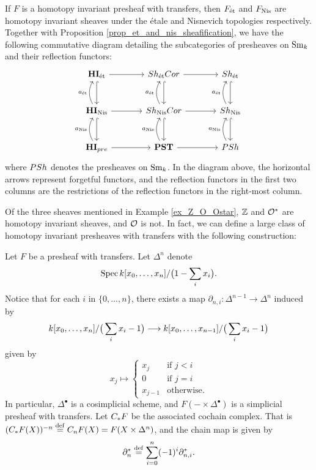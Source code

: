 \begin{rmk}
If $F$ is a homotopy invariant presheaf with transfers, then
$\Etale{F}$ and $\NisSh{F}$ are homotopy invariant sheaves under
the \'etale and Nisnevich topologies respectively. Together with
Proposition \ref{prop_et_and_nis_sheafification}, we have the following
commutative diagram detailing the subcategories of presheaves on
$\Sm$ and their reflection functors:
\[
\begin{tikzcd}[column sep=large, row sep=large]
\HIEt \arrow{r} \arrow[hookrightarrow]{d} &
\ShEtCor \arrow{r} \arrow[hookrightarrow]{d} &
\ShEt \arrow[hookrightarrow]{d} \\
\HINis \arrow{r} \arrow[hookrightarrow]{d} 
\arrow[bend left]{u}{\etale}&
\ShNisCor \arrow{r} \arrow[hookrightarrow]{d} 
\arrow[bend left]{u}{\etale}&
\ShNis \arrow[hookrightarrow]{d} 
\arrow[bend left]{u}{\etale}\\
\HIPST \arrow{r} \arrow[bend left]{u}{\nis} &
\PST \arrow{r} \arrow[bend left]{u}{\nis}&
\PSh \arrow[bend left]{u}{\nis}
\end{tikzcd}
\]
where $\PSh$ denotes the presheaves on $\Sm$. In the diagram above,
the horizontal arrows represent forgetful functors, and
the reflection functors in the first two columns are the restrictions
of the reflection functors in the right-most column.
\end{rmk}

Of the three sheaves mentioned in Example \ref{ex_Z_O_Ostar}, $\Z$
and $\Ox$ are homotopy invariant sheaves, and $\O$ is not. In fact,
we can define a large class of homotopy invariant presheaves with
transfers with the following construction:

\begin{constr}\label{constr_suslin_C}
Let $F$ be a presheaf with transfers. Let $\Delta^n$ denote
\[
\Spec \basefield [x_0,\dots,x_n]/\big(1 - \sum_{i} x_i \big).
\]
Notice that for each $i$ in $\{0,...,n\}$, there exists a map 
$\partial_{n, i} : \Delta^{n - 1} \to \Delta^{n}$ induced by
\[
\basefield [x_0,\dots,x_n]/\big(\sum_{i} x_i - 1 \big)
\to \basefield [x_0,\dots,x_{n - 1}]/\big(\sum_{i} x_i - 1 \big)
\]
given by 
\[
x_j \mapsto
\begin{cases}
x_j & \textrm{if }j < i \\
0 & \textrm{if }j = i \\
x_{j - 1} &\textrm{otherwise}.
\end{cases}
\]
In particular, $\Delta^{\bullet}$ is a cosimplicial scheme, and 
$F( - \times \Delta^\bullet)$ is a simplicial presheaf with
transfers. Let $\suslC F$ be the associated cochain complex. That
is $(\suslC F(X))^{-n} \defeq \suslC[n] F(X) = F(X \times 
\Delta^n)$, and the chain map is given by
\[
\partial_{n}^* \defeq \sum_{i = 0}^{n} (-1)^i \partial_{n,i}^*.
\]
\end{constr}

